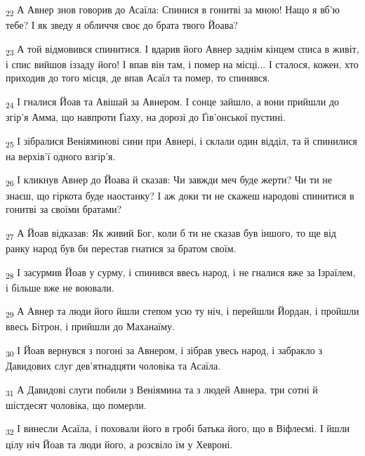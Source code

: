 \begin{tcolorbox}
\textsubscript{22} А Авнер знов говорив до Асаїла: Спинися в гонитві за мною! Нащо я вб'ю тебе? І як зведу я обличчя своє до брата твого Йоава?
\end{tcolorbox}
\begin{tcolorbox}
\textsubscript{23} А той відмовився спинитися. І вдарив його Авнер заднім кінцем списа в живіт, і спис вийшов іззаду його! І впав він там, і помер на місці... І сталося, кожен, хто приходив до того місця, де впав Асаїл та помер, то спинявся.
\end{tcolorbox}
\begin{tcolorbox}
\textsubscript{24} І гналися Йоав та Авішай за Авнером. І сонце зайшло, а вони прийшли до згір'я Амма, що навпроти Ґіаху, на дорозі до Ґів'онської пустині.
\end{tcolorbox}
\begin{tcolorbox}
\textsubscript{25} І зібралися Веніяминові сини при Авнері, і склали один відділ, та й спинилися на верхів'ї одного взгір'я.
\end{tcolorbox}
\begin{tcolorbox}
\textsubscript{26} І кликнув Авнер до Йоава й сказав: Чи завжди меч буде жерти? Чи ти не знаєш, що гіркота буде наостанку? І аж доки ти не скажеш народові спинитися в гонитві за своїми братами?
\end{tcolorbox}
\begin{tcolorbox}
\textsubscript{27} А Йоав відказав: Як живий Бог, коли б ти не сказав був іншого, то ще від ранку народ був би перестав гнатися за братом своїм.
\end{tcolorbox}
\begin{tcolorbox}
\textsubscript{28} І засурмив Йоав у сурму, і спинився ввесь народ, і не гналися вже за Ізраїлем, і більше вже не воювали.
\end{tcolorbox}
\begin{tcolorbox}
\textsubscript{29} А Авнер та люди його йшли степом усю ту ніч, і перейшли Йордан, і пройшли ввесь Бітрон, і прийшли до Маханаїму.
\end{tcolorbox}
\begin{tcolorbox}
\textsubscript{30} І Йоав вернувся з погоні за Авнером, і зібрав увесь народ, і забракло з Давидових слуг дев'ятнадцяти чоловіка та Асаїла.
\end{tcolorbox}
\begin{tcolorbox}
\textsubscript{31} А Давидові слуги побили з Веніямина та з людей Авнера, три сотні й шістдесят чоловіка, що померли.
\end{tcolorbox}
\begin{tcolorbox}
\textsubscript{32} І винесли Асаїла, і поховали його в гробі батька його, що в Віфлеємі. І йшли цілу ніч Йоав та люди його, а розсвіло їм у Хевроні.
\end{tcolorbox}
